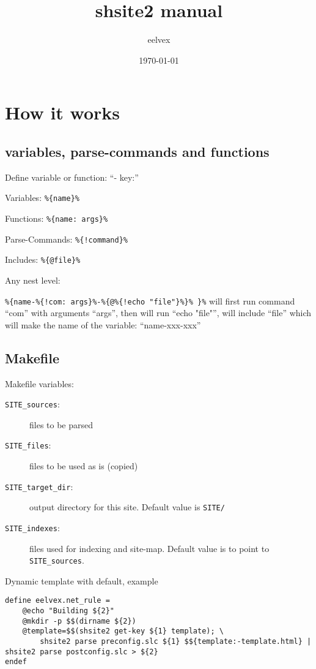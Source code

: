 \documentclass{memoir}
\title{shsite2 manual}
\author{eelvex}
\date{\today}
\newcommand{\var}[1]{\texttt{\%\{#1\}\%}}
\begin{document}
\begin{titlingpage}
\maketitle
\end{titlingpage}
\tableofcontents

\chapter{How it works} %

\section{variables, parse-commands and functions} %

	Define variable or function: ``- key:''

	Variables: \var{name}

	Functions: \var{name: args}

	Parse-Commands: \var{!command}

	Includes:  \var{@file}

	Any nest level:

	\var{name-\var{!com: args}-\var{@\var{!echo "file"}} }
	will first run command ``com'' with arguments ``args'', then will run ``echo "file"'', will include ``file''
	which will make the name of the variable: ``name-xxx-xxx''



\section{Makefile} %

Makefile variables:
\begin{description}
\item[\texttt{SITE\_sources}:] files to be parsed
\item[\texttt{SITE\_files}:] files to be used as is (copied)
\item[\texttt{SITE\_target\_dir}:] output directory for this site. Default value is \texttt{SITE/}
\item[\texttt{SITE\_indexes}:] files used for indexing and site-map. Default value is to point to \texttt{SITE\_sources}.
\end{description}

Dynamic template with default, example
\tabson
\begin{verbatim}
define eelvex.net_rule =
	@echo "Building ${2}"
	@mkdir -p $$(dirname ${2})
	@template=$$(shsite2 get-key ${1} template); \
		shsite2 parse preconfig.slc ${1} $${template:-template.html} | shsite2 parse postconfig.slc > ${2}
endef
\end{verbatim}
\end{document}

